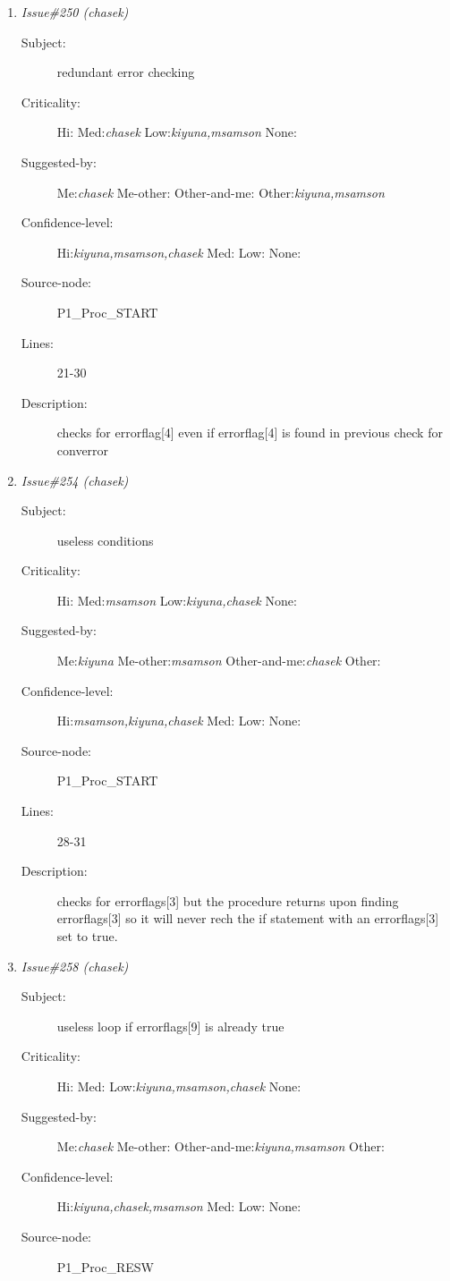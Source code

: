 \begin{enumerate}
\begin{description}
\item [Lines:] 74-76

\item [Description:] goes straight to the comment and skips the operand
\end{description}
\item {\it Issue\#250 (chasek)}
\begin{description}
\item [Subject:] redundant error checking
\item [Criticality:] Hi:{\it } Med:{\it chasek} Low:{\it kiyuna,msamson} None:{\it }
\item [Suggested-by:] Me:{\it chasek} Me-other:{\it } Other-and-me:{\it } Other:{\it kiyuna,msamson}
\item [Confidence-level:] Hi:{\it kiyuna,msamson,chasek} Med:{\it } Low:{\it } None:{\it }
\item [Source-node:] P1\_Proc\_START

\item [Lines:] 21-30

\item [Description:] checks for errorflag[4] even if errorflag[4]
is found in previous check for converror
\end{description}
\item {\it Issue\#254 (chasek)}
\begin{description}
\item [Subject:] useless conditions
\item [Criticality:] Hi:{\it } Med:{\it msamson} Low:{\it kiyuna,chasek} None:{\it }
\item [Suggested-by:] Me:{\it kiyuna} Me-other:{\it msamson} Other-and-me:{\it chasek} Other:{\it }
\item [Confidence-level:] Hi:{\it msamson,kiyuna,chasek} Med:{\it } Low:{\it } None:{\it }
\item [Source-node:] P1\_Proc\_START

\item [Lines:] 28-31

\item [Description:] checks for errorflags[3] but the procedure
returns upon finding errorflags[3] so it will never rech the if statement
with an errorflags[3] set to true.
\end{description}
\item {\it Issue\#258 (chasek)}
\begin{description}
\item [Subject:] useless loop if errorflags[9] is already true
\item [Criticality:] Hi:{\it } Med:{\it } Low:{\it kiyuna,msamson,chasek} None:{\it }
\item [Suggested-by:] Me:{\it chasek} Me-other:{\it } Other-and-me:{\it kiyuna,msamson} Other:{\it }
\item [Confidence-level:] Hi:{\it kiyuna,chasek,msamson} Med:{\it } Low:{\it } None:{\it }
\item [Source-node:] P1\_Proc\_RESW


\end{description}
\end{enumerate}
